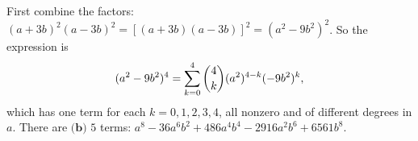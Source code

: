 First combine the factors: $(a+3b)^2(a-3b)^2=\left[(a+3b)(a-3b)\right]^2=(a^2-9b^2)^2$. So the expression is
\[
(a^2-9b^2)^4=\sum_{k=0}^{4}\dbinom{4}{k}(a^2)^{4-k}(-9b^2)^k,
\]
which has one term for each $k=0,1,2,3,4$, all nonzero and of different degrees in $a$. There are $\boxed{\textbf{(b) }5}$ terms: $a^8-36a^6b^2+486a^4b^4-2916a^2b^6+6561b^8$.

